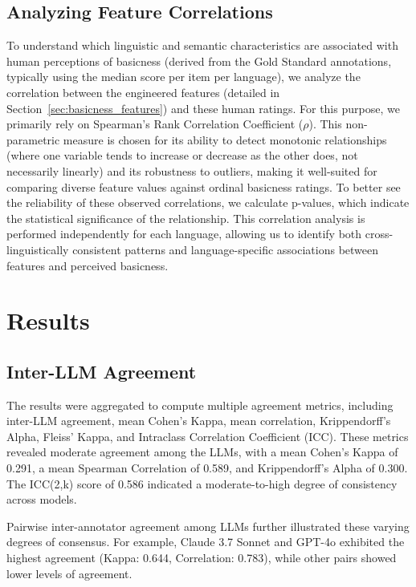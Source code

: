 \documentclass[preprint,12pt,authoryear]{elsarticle}
\begin{document}
\subsection{Analyzing Feature Correlations}

To understand which linguistic and semantic characteristics are associated with human perceptions of basicness (derived from the Gold Standard annotations, typically using the median score per item per language), we analyze the correlation between the engineered features (detailed in Section~\ref{sec:basicness_features}) and these human ratings. For this purpose, we primarily rely on Spearman's Rank Correlation Coefficient ($\rho$). This non-parametric measure is chosen for its ability to detect monotonic relationships (where one variable tends to increase or decrease as the other does, not necessarily linearly) and its robustness to outliers, making it well-suited for comparing diverse feature values against ordinal basicness ratings. To better see the reliability of these observed correlations, we calculate p-values, which indicate the statistical significance of the relationship. This correlation analysis is performed independently for each language, allowing us to identify both cross-linguistically consistent patterns and language-specific associations between features and perceived basicness.

\section{Results}

\subsection{Inter-LLM Agreement}

The results were aggregated to compute multiple agreement metrics, including inter-LLM agreement, mean Cohen's Kappa, mean correlation, Krippendorff's Alpha, Fleiss' Kappa, and Intraclass Correlation Coefficient (ICC). These metrics revealed moderate agreement among the LLMs, with a mean Cohen's Kappa of 0.291, a mean Spearman Correlation of 0.589, and Krippendorff's Alpha of 0.300. The ICC(2,k) score of 0.586 indicated a moderate-to-high degree of consistency across models.

Pairwise inter-annotator agreement among LLMs further illustrated these varying degrees of consensus. For example, Claude 3.7 Sonnet and GPT-4o exhibited the highest agreement (Kappa: 0.644, Correlation: 0.783), while other pairs showed lower levels of agreement.
\end{document}
